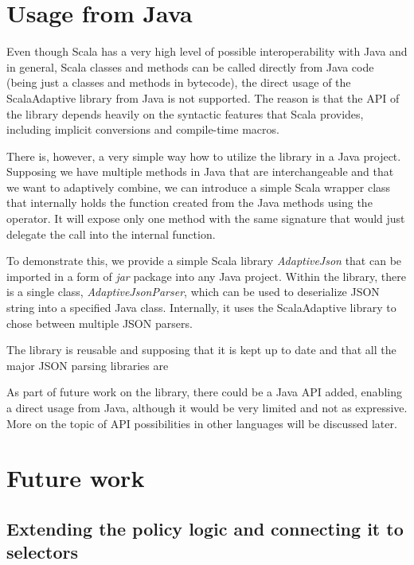 \section{Usage from Java}

Even though Scala has a very high level of possible interoperability with Java and in general, Scala classes and methods can be called directly from Java code (being just a classes and methods in bytecode), the direct usage of the ScalaAdaptive library from Java is not supported. The reason is that the API of the library depends heavily on the syntactic features that Scala provides, including implicit conversions and compile-time macros.

There is, however, a very simple way how to utilize the library in a Java project. Supposing we have multiple methods in Java that are interchangeable and that we want to adaptively combine, we can introduce a simple Scala wrapper class that internally holds the function created from the Java methods using the  operator. It will expose only one method with the same signature that would just delegate the call into the internal function.

To demonstrate this, we provide a simple Scala library \textit{AdaptiveJson} that can be imported in a form of \textit{jar} package into any Java project. Within the library, there is a single class, \textit{AdaptiveJsonParser}, which can be used to deserialize JSON string into a specified Java class. Internally, it uses the ScalaAdaptive library to chose between multiple JSON parsers.

The library is reusable and supposing that it is kept up to date and that all the major JSON parsing libraries are 


As part of future work on the library, there could be a Java API added, enabling a direct usage from Java, although it would be very limited and not as expressive. More on the topic of API possibilities in other languages will be discussed later.



\section{Future work}

\subsection{Extending the policy logic and connecting it to selectors}

